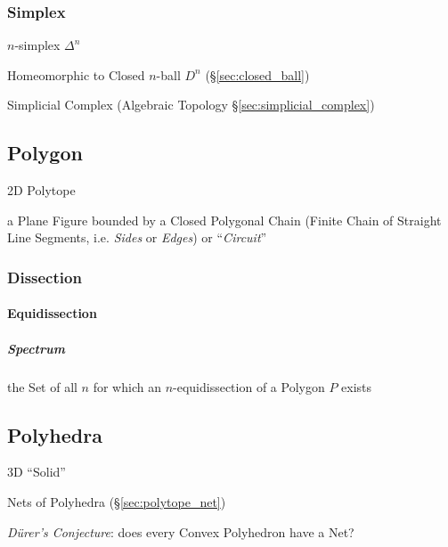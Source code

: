 \subsubsection{Simplex}\label{sec:simplex}

$n$-simplex $\Delta^n$

Homeomorphic to Closed $n$-ball $D^n$ (\S\ref{sec:closed_ball})

\fist Simplicial Complex (Algebraic Topology \S\ref{sec:simplicial_complex})



\subsection{Polygon}\label{sec:polygon}

2D Polytope

a Plane Figure bounded by a Closed Polygonal Chain (Finite Chain of Straight
Line Segments, i.e. \emph{Sides} or \emph{Edges}) or ``\emph{Circuit}''



\subsubsection{Dissection}\label{sec:dissection}

\paragraph{Equidissection}\label{sec:equidissection}\hfill

\subparagraph{Spectrum}\label{sec:polygon_spectrum}\hfill

the Set of all $n$ for which an $n$-equidissection of a Polygon $P$ exists



\subsection{Polyhedra}\label{sec:polyhedra}

3D ``Solid''

Nets of Polyhedra (\S\ref{sec:polytope_net})

\emph{D\"urer's Conjecture}: does every Convex Polyhedron have a Net?

